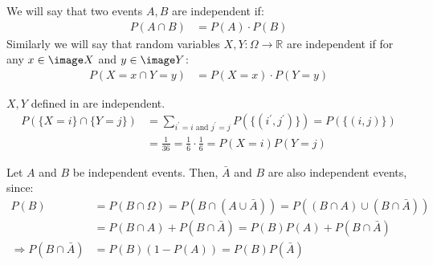 \begin{definition}
  We will say that two events $A,B$ are independent if:
\begin{equation*}
    \begin{split}
      P(A \cap B) &= P(A) \cdot P (B) %
    \end{split}
  \end{equation*}
  Similarly we will say that random variables $X,Y : \Omega \rightarrow \mathbb{R}$  are independent if for any $x\in \image X$ and $y \in \image Y$:   
  \begin{equation*}
    \begin{split}
      P(X = x \cap Y = y) &= P(X = x) \cdot P (Y = y) %
    \end{split}
  \end{equation*}
  \end{definition}
  \begin{example}
    $X,Y$ defined in  are independent. 
    \begin{equation*}
      \begin{split}
        P(\{X = i\} \cap \{Y = j\} ) &= \sum_{i^{\prime} = i \text{ and } j^{\prime}=j }P(\{(i^{\prime}, j^{\prime})\}) = P(\{ (i,j) \} ) \\ 
        &= \frac{1}{36} = \frac{1}{6} \cdot \frac{1}{6}  = P(X = i)P(Y = j)
      \end{split}
    \end{equation*}
  \end{example}

  \begin{example}
    Let $A$ and $B$ be independent events. Then, $\bar{A}$ and $B$ are also independent events, since:
    \begin{equation*}
      \begin{split}
    P(B) &= P(B \cap \Omega) = P(B \cap (A \cup \bar{A})) = P((B \cap A) \cup (B \cap \bar{A}))\\
    &= P(B \cap A) + P(B \cap \bar{A}) = P(B)P(A) +    P(B \cap \bar{A} ) \\
    \Rightarrow  P(B \cap \bar{A} ) & = P(B)(1 - P(A)) = P(B)P(\bar{A})
      \end{split}
    \end{equation*}
  \end{example}


